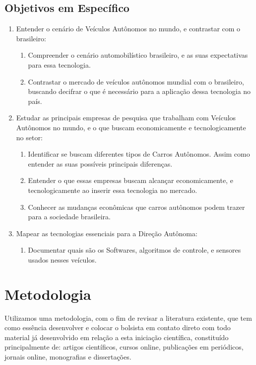 \section{Objetivos em Específico}\label{Objetivos Específicos}
\begin{enumerate}
    \item  Entender o cenário de Veículos Autônomos no mundo, e contrastar com o brasileiro:
    \begin{enumerate}
        \item Compreender o cenário automobilístico brasileiro, e as suas expectativas para essa tecnologia.
        \item Contrastar o mercado de veículos autônomos mundial com o brasileiro, buscando  decifrar o que é necessário para a aplicação dessa tecnologia no país.
    \end{enumerate}
    \item  Estudar as principais empresas de pesquisa que trabalham com Veículos Autônomos no mundo, e o que buscam economicamente e tecnologicamente no setor:
    \begin{enumerate}
        \item Identificar se buscam diferentes tipos de Carros Autônomos. Assim como entender as suas possíveis principais diferenças.
        \item Entender o que essas empresas buscam alcançar economicamente, e tecnologicamente ao inserir essa tecnologia no mercado.
        \item Conhecer as mudanças econômicas que carros autônomos podem trazer para a sociedade brasileira. 
    \end{enumerate}
    \item Mapear as tecnologias essenciais para a Direção Autônoma:
    \begin{enumerate}
        \item Documentar quais são os Softwares, algoritmos de controle, e sensores usados nesses veículos.  
    \end{enumerate}
\end{enumerate}

\newpage
\chapter{Metodologia}
Utilizamos uma metodologia, com o fim de revisar a literatura existente, que tem como essência desenvolver e colocar o bolsista em contato direto com todo material já desenvolvido em relação a esta iniciação científica, constituído principalmente de: artigos científicos, cursos online, publicações em periódicos, jornais online, monografias e dissertações.

